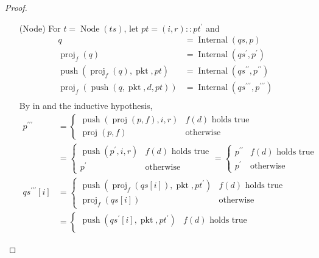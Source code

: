 \documentclass{amsart}
\DeclareMathOperator{\pkt}{\mathrm{pkt}}
\DeclareMathOperator{\push}{\mathrm{push}}
\DeclareMathOperator{\proj}{\mathrm{proj}}
\DeclareMathOperator{\Internal}{\mathrm{Internal}}
\DeclareMathOperator{\Node}{\mathrm{Node}}
\theoremstyle{definition}
\begin{document}
\begin{proof}
\begin{itemize}
        \item[(Node)] For $t = \Node(ts)$, let $pt = (i, r) :: pt^\prime$ and
            \begin{align*}
                q &= \Internal(qs, p)\\
                \proj_f(q) &= \Internal(qs^\prime, p^\prime)\\
                \push(\proj_f(q), \pkt, pt) &= \Internal(qs^{\prime\prime}, p^{\prime\prime})\\
                \proj_f(\push(q, \pkt, d, pt)) &= \Internal(qs^{\prime\prime\prime}, p^{\prime\prime\prime})\\
            \end{align*}
            By  in  and the inductive hypothesis,
            \begin{align*}
                p^{\prime\prime\prime} &= 
                \begin{cases}
                    \push(\proj(p, f), i, r) & f(d) \text{ holds true}\\
                    \proj(p, f) & \text{otherwise}
                \end{cases}\\
                                                 &=
                \begin{cases}
                    \push(p^\prime, i, r) & f(d) \text{ holds true}\\
                    p^\prime & \text{otherwise}
                \end{cases}
                                                 =
                \begin{cases}
                    p^{\prime\prime} & f(d) \text{ holds true}\\
                    p^\prime & \text{otherwise}
                \end{cases}\\
                qs^{\prime\prime\prime}[i] &= 
                \begin{cases}
                    \push(\proj_f(qs[i]), \pkt, pt^\prime) & f(d) \text{ holds true}\\
                    \proj_f(qs[i]) & \text{otherwise}
                \end{cases}\\
                                                            &=
                \begin{cases}
                    \push(qs^\prime[i], \pkt, pt^\prime) & f(d) \text{ holds true}\\

\end{cases}
\end{align*}
\end{itemize}
\end{proof}
\end{document}
